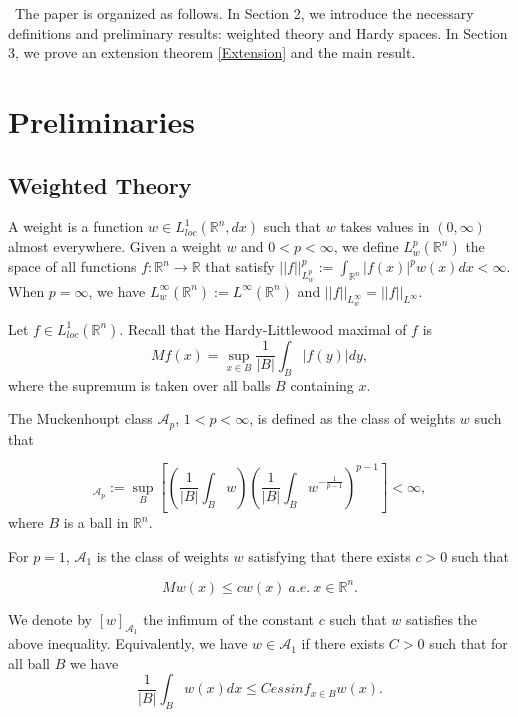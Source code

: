 \documentclass[a4paper,12pt,reqno]{amsart}
\numberwithin{equation}{section}
\begin{document}
	\
	The paper is organized as follows. In Section 2, we introduce the necessary definitions and preliminary results: weighted theory and Hardy spaces. 
	In Section 3, we prove an extension theorem \ref{Extension} and the main result.
	
	\section{Preliminaries}
	
	\subsection{Weighted Theory}
	A weight is a function $w\in L^1_{loc}(\mathbb{R}^n, dx)$ such that $w$ takes values in $(0,\infty)$ almost everywhere.
	Given a weight $w$ and $0<p<\infty$, we define $L^{p}_w(\mathbb{R}^{n})$ the space of all functions $f:\mathbb{R}^{n}\rightarrow \mathbb{R}$ that satisfy $||f||^{p}_{L^{p}_w}:=\int_{\mathbb{R}^{n}} |f(x)|^{p}w(x)dx< \infty$. When $p=\infty$, we have $L^{\infty}_w(\mathbb{R}^{n}):=L^{\infty}(\mathbb{R}^{n})$ and $||f||_{L^{\infty}_w}=||f||_{L^{\infty}}$. 
	
	Let $f \in L^{1}_{loc}(\mathbb{R}^{n})$. Recall that the Hardy-Littlewood maximal of $f$ is
	$$Mf(x)=\sup_{x \in B} \frac{1}{|B|} \int_B |f(y)| dy,$$
	where the supremum is taken over all balls $B$ containing $x$. 
	
	The Muckenhoupt class $\mathcal{A}_{p}$, $1<p<\infty $, is defined as the class of weights $w $ such that
	
	\begin{equation*}
		[w]_{\mathcal{A}_p}:=\sup_{B} \left[ \left( \frac{1}{\lvert B \rvert} \displaystyle \int_B w
		\right) \left( \frac{1}{\lvert B \rvert} \displaystyle \int_B w^{-\frac{
				1}{p-1}} \right)^{p-1} \right] < \infty,
	\end{equation*}
	where $B$ is a ball in $\mathbb{R}^n$.
	
	For $p=1$, $\mathcal{A}_1$ is the class of weights $w$ satisfying that
	there exists $c>0$ such that
	
	\begin{equation*}
		Mw(x) \leq c w(x) \ a.e. \ x \in \mathbb{R}^n.
	\end{equation*}
	
	We denote by $\left[ w \right]_{\mathcal{A}_1}$ the infimum of the
	constant $c$ such that $w$ satisfies the above inequality.
	Equivalently, we have $w \in \mathcal{A}_1$ if there exists $C>0$ such that for all ball $B$ we have
	$$\frac{1}{|B|} \int_B w(x) dx \leq C essinf_{x \in B} w(x).$$
	
\end{document}
